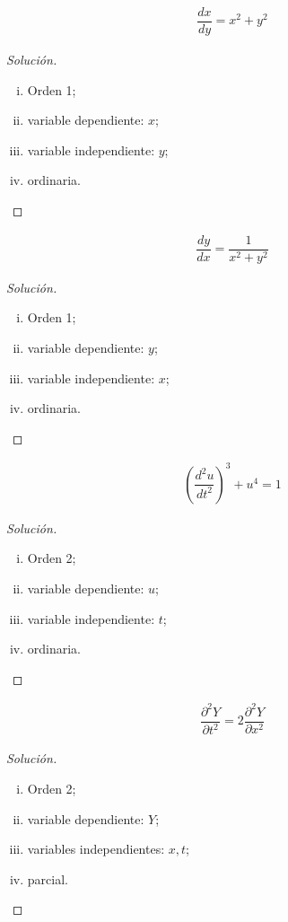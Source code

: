 {}
	\begin{align*}
		\dfrac{dx}{dy}= x^{2}+y^{2}
	\end{align*} 
	\begin{proof}[Solución]
		\begin{enumerate}[(i)]
			\item Orden 1; 
			\item variable dependiente: $ x $; 
			\item variable independiente: $ y $; 
			\item ordinaria.
		\end{enumerate}
	\end{proof}

{}
	\begin{align*}
	\dfrac{dy}{dx}= \dfrac{1}{x^{2}+y^{2}}
	\end{align*} 
	\begin{proof}[Solución]
		\begin{enumerate}[(i)]
			\item Orden 1; 
			\item variable dependiente: $ y $; 
			\item variable independiente: $ x $; 
			\item ordinaria.
		\end{enumerate}
	\end{proof}

{}
	\begin{align*}
	\left(\dfrac{d^{2}u}{dt^{2}}\right)^{3}+u^{4}=1
	\end{align*} 
	\begin{proof}[Solución]
		\begin{enumerate}[(i)]
			\item Orden 2; 
			\item variable dependiente: $ u $; 
			\item variable independiente: $ t $; 
			\item ordinaria.
		\end{enumerate}
	\end{proof}


{}
	\begin{align*}
	\dfrac{\partial^{2}Y}{\partial t^{2}} = 2\dfrac{\partial^{2}Y}{\partial x^{2}}
	\end{align*} 
	\begin{proof}[Solución]
		\begin{enumerate}[(i)]
			\item Orden 2; 
			\item variable dependiente: $ Y $; 
			\item variables independientes: $ x,t $; 
			\item parcial.
		\end{enumerate}
	\end{proof}

